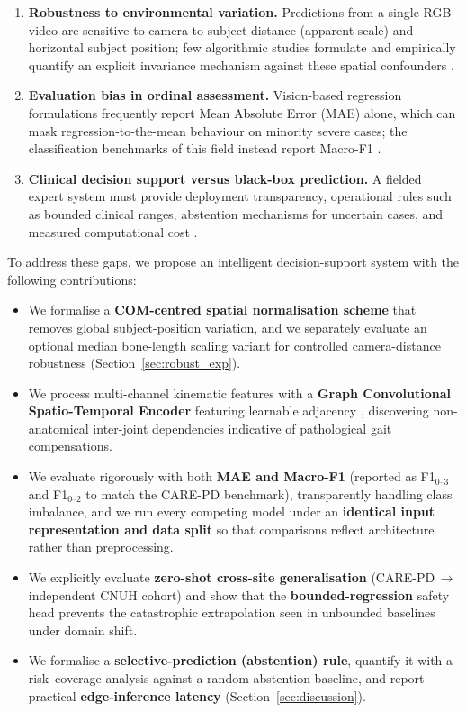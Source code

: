 \documentclass[preprint,12pt]{elsarticle}
\begin{document}
\begin{enumerate}
    \item \textbf{Robustness to environmental variation.} Predictions from a
    single RGB video are sensitive to camera-to-subject distance (apparent
    scale) and horizontal subject position; few algorithmic studies formulate
    and empirically quantify an explicit invariance mechanism against these
    spatial confounders \cite{gennarelli2025skelmamba}.
    \item \textbf{Evaluation bias in ordinal assessment.} Vision-based
    regression formulations frequently report Mean Absolute Error (MAE) alone,
    which can mask regression-to-the-mean behaviour on minority severe cases;
    the classification benchmarks of this field instead report Macro-F1
    \cite{adeli2025carepd}.
    \item \textbf{Clinical decision support versus black-box prediction.}
    A fielded expert system must provide deployment transparency, operational
    rules such as bounded clinical ranges, abstention mechanisms for uncertain
    cases, and measured computational cost \cite{sun2024digital}.
\end{enumerate}

To address these gaps, we propose an intelligent decision-support system with
the following contributions:
\begin{itemize}
    \item We formalise a \textbf{COM-centred spatial normalisation scheme}
    that removes global subject-position variation, and we separately evaluate
    an optional median bone-length scaling variant for controlled
    camera-distance robustness (Section~\ref{sec:robust_exp}).
    \item We process multi-channel kinematic features with a \textbf{Graph
    Convolutional Spatio-Temporal Encoder} featuring learnable adjacency
    \cite{shi2019twoStream}, discovering non-anatomical inter-joint
    dependencies indicative of pathological gait compensations.
    \item We evaluate rigorously with both \textbf{MAE and Macro-F1}
    (reported as F1$_{0\text{--}3}$ and F1$_{0\text{--}2}$ to match the CARE-PD
    benchmark), transparently handling class imbalance, and we run every
    competing model under an \textbf{identical input representation and data
    split} so that comparisons reflect architecture rather than preprocessing.
    \item We explicitly evaluate \textbf{zero-shot cross-site generalisation}
    (CARE-PD\,$\to$\,independent CNUH cohort) and show that the
    \textbf{bounded-regression} safety head prevents the catastrophic
    extrapolation seen in unbounded baselines under domain shift.
    \item We formalise a \textbf{selective-prediction (abstention) rule},
    quantify it with a risk--coverage analysis against a random-abstention
    baseline, and report practical \textbf{edge-inference latency}
    (Section~\ref{sec:discussion}).
\end{itemize}
\end{document}
